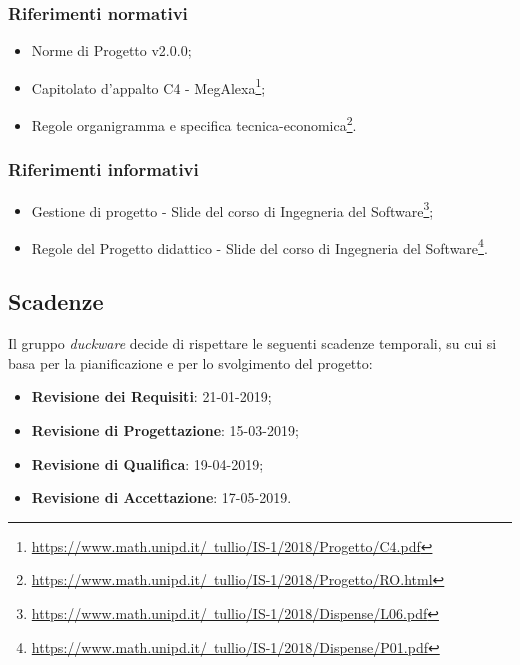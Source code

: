 \subsubsection{Riferimenti normativi}
\begin{itemize}
	\item Norme di Progetto v2.0.0;
	\item Capitolato d'appalto C4 - MegAlexa\footnote{\href{https://www.math.unipd.it/~tullio/IS-1/2018/Progetto/C4.pdf}{https://www.math.unipd.it/~tullio/IS-1/2018/Progetto/C4.pdf}};
	\item Regole organigramma e specifica tecnica-economica\footnote{\href{https://www.math.unipd.it/~tullio/IS-1/2018/Progetto/RO.html}{https://www.math.unipd.it/~tullio/IS-1/2018/Progetto/RO.html}}.
\end{itemize}
\subsubsection{Riferimenti informativi}
\begin{itemize}
	\item Gestione di progetto - Slide del corso di Ingegneria del Software\footnote{\href{https://www.math.unipd.it/~tullio/IS-1/2018/Dispense/L06.pdf}{https://www.math.unipd.it/~tullio/IS-1/2018/Dispense/L06.pdf}};
	\item Regole del Progetto didattico - Slide del corso di Ingegneria del Software\footnote{\href{https://www.math.unipd.it/~tullio/IS-1/2018/Dispense/P01.pdf}{https://www.math.unipd.it/~tullio/IS-1/2018/Dispense/P01.pdf}}.
\end{itemize}
\clearpage
\hypertarget{scadenze}{}
\subsection{Scadenze}
Il gruppo \emph{duckware} decide di rispettare le seguenti scadenze temporali, su cui si basa per la pianificazione e per lo svolgimento del progetto:
\begin{itemize}
	\item \textbf{Revisione dei Requisiti}: 21-01-2019;
	\item \textbf{Revisione di Progettazione}: 15-03-2019;
	\item \textbf{Revisione di Qualifica}: 19-04-2019;
	\item \textbf{Revisione di Accettazione}: 17-05-2019.
\end{itemize}
